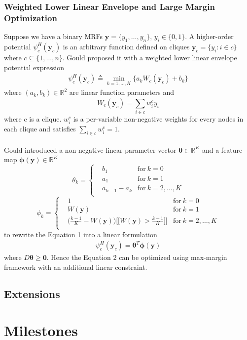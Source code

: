 \documentclass{article}
\begin{document}
		\subsubsection{Weighted Lower Linear Envelope and Large Margin Optimization}
		Suppose we have a binary MRFs $\mathbf{y}=\{y_1,\dots,y_n\}$, $y_i\in\{0,1\}$. A higher-order potential $\psi_c^H(\mathbf{y}_c)$ is an arbitrary function defined on cliques $\mathbf{y}_c=\{y_i : i\in c\}$ where $c\subseteq\{1,\dots,n\}$. Gould\cite{gouldlearning} proposed it with a weighted lower linear envelope potential expression
		\begin{align}
		\psi_c^H(\mathbf{y}_c) \triangleq \min_{k=1,\dots,K}\bigg\{a_kW_c(\mathbf{y}_c)+b_k\bigg\}
		\end{align}
		where $(a_k,b_k)\in\mathbb{R}^2$ are linear function parameters and
		$$
		W_c(\mathbf{y}_c) = \sum_{i\in c}^{}w_i^cy_i
		$$
		where c is a clique. $w_i^c$ is a per-variable non-negative weights for every nodes in each clique and satisfies $\sum_ {i\in c}^{}w_i^c=1$.\\\\
		Gould\cite{gouldlearning} introduced a non-negative linear parameter vector $\boldsymbol{\theta}\in\mathbb{R}^K$ and a feature map $\boldsymbol{\phi}(\mathbf{y})\in \mathbb{R}^K$ 
		\begin{equation*}
		\theta_k = \left\{
		\begin{aligned}
		& b_1	& \text{for} \ k=0\\
		& a_1 & \text{for}\ k=1\\
		& a_{k-1}-a_k  & \text{for} \ k=2,\dots,K\\
		\end{aligned}
		\right.
		\end{equation*}
		\begin{equation*}
		\phi_k = \left\{
		\begin{aligned}
		& 1	& \text{for} \ k=0\\
		& W(\mathbf{y}) & \text{for}\ k=1\\
		& \bigg(\frac{k-1}{K}-W(\mathbf{y}) \bigg)\bigg[\bigg[ W(\mathbf{y}) > \frac{k-1}{K}\bigg]\bigg]  & \text{for} \ k=2,\dots,K\\
		\end{aligned}
		\right.
		\end{equation*}
		to rewrite the Equation 1 into a linear formulation
		\begin{align}
		\psi_c^H(\mathbf{y}_c)=\boldsymbol{\theta}^T\boldsymbol{\phi}(\mathbf{y})
		\end{align}
		where $ D\boldsymbol{\theta}\geq \mathbf{0}$. Hence the Equation 2 can be optimized using max-margin framework with an additional linear constraint.
		

	\subsection{Extensions}


	\section{Milestones}
	
	\renewcommand\refname{Bibliography}
	
	
\end{document}
